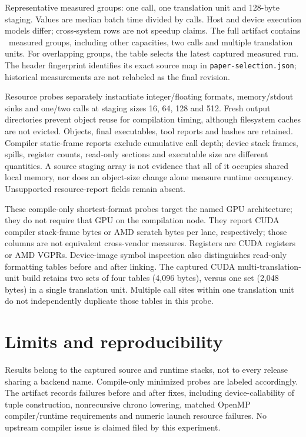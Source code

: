 \documentclass[11pt,letterpaper]{article}
\begin{document}
\benchmarktable
Representative measured groups: one call, one translation unit and
128-byte staging. Values are median batch time divided by calls. Host and
device execution models differ; cross-system rows are not speedup claims.
The full artifact contains \measuredgroups\ measured groups, including other
capacities, two calls and multiple translation units. For overlapping groups,
the table selects the latest captured measured run. The header fingerprint
identifies its exact source map in \texttt{paper-selection.json}; historical
measurements are not relabeled as the final revision.

Resource probes separately instantiate integer/floating formats, memory/stdout
sinks and one/two calls at staging sizes 16, 64, 128 and 512. Fresh output
directories prevent object reuse for compilation timing, although filesystem
caches are not evicted. Objects, final executables, tool reports and hashes
are retained. Compiler static-frame reports exclude cumulative call depth;
device stack frames, spills, register counts, read-only sections and executable
size are different quantities. A source staging array is not evidence that
all of it occupies shared local memory, nor does an object-size change alone
measure runtime occupancy. Unsupported resource-report fields remain absent.

\resourcetable
These compile-only shortest-format probes target the named GPU architecture;
they do not require that GPU on the compilation node. They report CUDA compiler stack-frame bytes
or AMD scratch bytes per lane, respectively; those columns are not equivalent
cross-vendor measures. Registers are CUDA registers or AMD VGPRs. Device-image
symbol inspection also distinguishes read-only formatting tables before and after
linking. The captured CUDA multi-translation-unit build retains two sets of
four tables (4,096 bytes), versus one set (2,048 bytes) in a single translation
unit. Multiple call sites within one translation unit do not independently
duplicate those tables in this probe.

\section{Limits and reproducibility}

Results belong to the captured source and runtime stacks, not to every
release sharing a backend name. Compile-only minimized probes are labeled
accordingly. The artifact records failures before and after fixes, including
device-callability of tuple construction, nonrecursive chrono lowering,
matched OpenMP compiler/runtime requirements and numeric launch resource
failures. No upstream compiler issue is claimed filed by this experiment.
\end{document}
